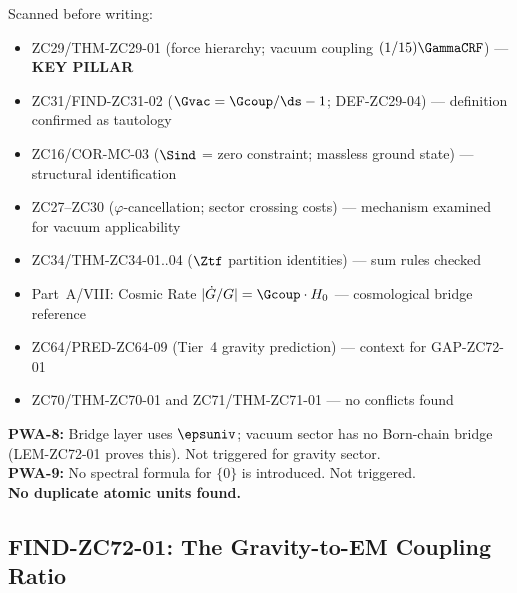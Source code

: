 \documentclass[12pt, a4paper]{article}
\begin{document}
\begin{formalbox}[title={Pre-Work Audit Record --- ZC72}]
Scanned before writing:
\begin{itemize}[leftmargin=2em, noitemsep]
  \item ZC29/THM-ZC29-01 (force hierarchy; vacuum coupling $(1/15)\GammaCRF$)
    --- \textbf{KEY PILLAR}
  \item ZC31/FIND-ZC31-02 ($\Gvac = \Gcoup/\ds - 1$; DEF-ZC29-04)
    --- definition confirmed as tautology
  \item ZC16/COR-MC-03 ($\Sind$ = zero constraint; massless ground state)
    --- structural identification
  \item ZC27--ZC30 ($\varphi$-cancellation; sector crossing costs)
    --- mechanism examined for vacuum applicability
  \item ZC34/THM-ZC34-01..04 ($\Ztf$ partition identities)
    --- sum rules checked
  \item Part~A/VIII: Cosmic Rate $|\dot{G}/G| = \Gcoup \cdot H_0$
    --- cosmological bridge reference
  \item ZC64/PRED-ZC64-09 (Tier~4 gravity prediction)
    --- context for GAP-ZC72-01
  \item ZC70/THM-ZC70-01 and ZC71/THM-ZC71-01 --- no conflicts found

\end{itemize}
\textbf{PWA-8:} Bridge layer uses $\epsuniv$; vacuum sector has no
Born-chain bridge (LEM-ZC72-01 proves this). Not triggered for
gravity sector.\\
\textbf{PWA-9:} No spectral formula for $\{0\}$ is introduced.
Not triggered.\\
\textbf{No duplicate atomic units found.}
\end{formalbox}

\newpage

\subsection{FIND-ZC72-01: The Gravity-to-EM Coupling Ratio}
\label{sec:find01}

\end{document}
